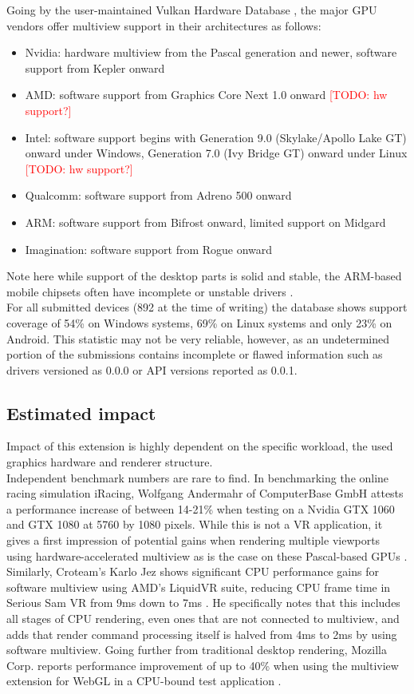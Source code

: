 Going by the user-maintained Vulkan Hardware Database \cite{Willems.2020}, the major GPU vendors offer multiview support in their architectures as follows: 
\begin{itemize}
\item Nvidia: hardware multiview from the Pascal generation and newer, software support from Kepler onward
\item AMD: software support from Graphics Core Next 1.0 onward \textcolor{red}{[TODO: hw support?]}
\item Intel: software support begins with Generation 9.0 (Skylake/Apollo Lake GT) onward under Windows, Generation 7.0 (Ivy Bridge GT) onward under Linux \textcolor{red}{[TODO: hw support?]}
\item Qualcomm: software support from Adreno 500 onward
\item ARM: software support from Bifrost onward, limited support on Midgard
\item Imagination: software support from Rogue onward
\end{itemize}
Note here while support of the desktop parts is solid and stable, the ARM-based mobile chipsets often have incomplete or unstable drivers \cite{Willems.2019}\cite{JMC47.2018}. \\
For all submitted devices (892 at the time of writing) the database shows support coverage of 54\% on Windows systems, 69\% on Linux systems and only 23\% on Android. This statistic may not be very reliable, however, as an undetermined portion of the submissions contains incomplete or flawed information such as drivers versioned as 0.0.0 or API versions reported as 0.0.1. 

\subsection{Estimated impact}
Impact of this extension is highly dependent on the specific workload, the used graphics hardware and renderer structure. \\
Independent benchmark numbers are rare to find. In benchmarking the online racing simulation iRacing, Wolfgang Andermahr of ComputerBase GmbH attests a performance increase of between 14-21\% when testing on a Nvidia GTX 1060 and GTX 1080 at 5760 by 1080 pixels. While this is not a VR application, it gives a first impression of potential gains when rendering multiple viewports using hardware-accelerated multiview as is the case on these Pascal-based GPUs \cite{Andermahr.2016}.
Similarly, Croteam's Karlo Jez shows significant CPU performance gains for software multiview using AMD's LiquidVR suite, reducing CPU frame time in Serious Sam VR from 9ms down to 7ms \cite{Jez.2017}. He specifically notes that this includes all stages of CPU rendering, even ones that are not connected to multiview, and adds that render command processing itself is halved from 4ms to 2ms by using software multiview. 
Going further from traditional desktop rendering, Mozilla Corp. reports performance improvement of up to 40\% when using the multiview extension for WebGL in a CPU-bound test application \cite{Serrano.2019}. 

